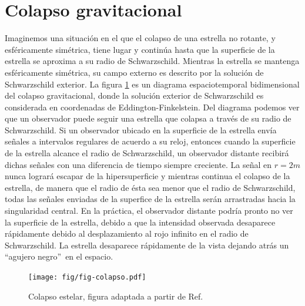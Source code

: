\section{Colapso gravitacional}

%
 Imaginemos una situación en el que el colapso de una estrella no rotante, y esféricamente simétrica, tiene lugar y continúa hasta que la superficie de la estrella se aproxima a su radio de Schwarzschild. Mientras la estrella se mantenga esféricamente simétrica, su campo externo es descrito por la solución de Schwarzschild exterior. La figura \ref{fig:colapso} es un diagrama  espaciotemporal bidimensional del colapso gravitacional, donde la solución exterior de Schwarzschild es considerada en coordenadas de Eddington-Finkelstein. Del diagrama podemos ver que un observador puede seguir una estrella que colapsa a través de su radio de Schwarzschild. Si un observador ubicado en la superficie de la estrella envía señales a intervalos regulares de acuerdo a su reloj, entonces cuando la superficie de la estrella alcance el radio de Schwarzschild, un observador distante recibirá dichas señales con una diferencia de tiempo siempre creciente. La señal en $r=2m$ nunca logrará escapar de la hipersuperficie y mientras continua el colapso de la estrella, de manera que el radio de ésta sea menor que el radio de Schwarzschild, todas las señales enviadas de la superfice de la estrella serán arrastradas hacia la singularidad central. En la práctica, el observador distante podría pronto no ver la superficie de la estrella, debido a que la intensidad observada desaparece rápidamente debido al desplazamiento al rojo infinito en el radio de Schwarzschild. La estrella desaparece rápidamente de la vista dejando atrás un ``agujero negro''\, en el espacio.

\begin{figure}[H]
\begin{center}
\texttt{[image: fig/fig-colapso.pdf]}
\caption{Colapso estelar, figura adaptada a partir de Ref. \cite{Luminet98}}
\label{fig:colapso}
\end{center}
\end{figure}